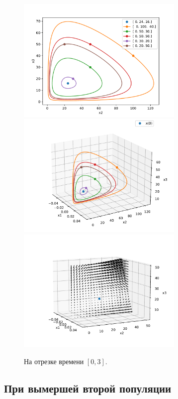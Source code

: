     \begin{figure}[H]
        \centering
        \includegraphics[width=8cm]{pictures/x1_0phase.pdf}
        \includegraphics[width=8cm]{pictures/x1_0phase3.pdf}
        \includegraphics[width=8cm]{pictures/x1_0vector3.pdf}
        \caption{На отрезке времени \( [0, 3] \).}
    \end{figure}


    \subsection{При вымершей второй популяции}

